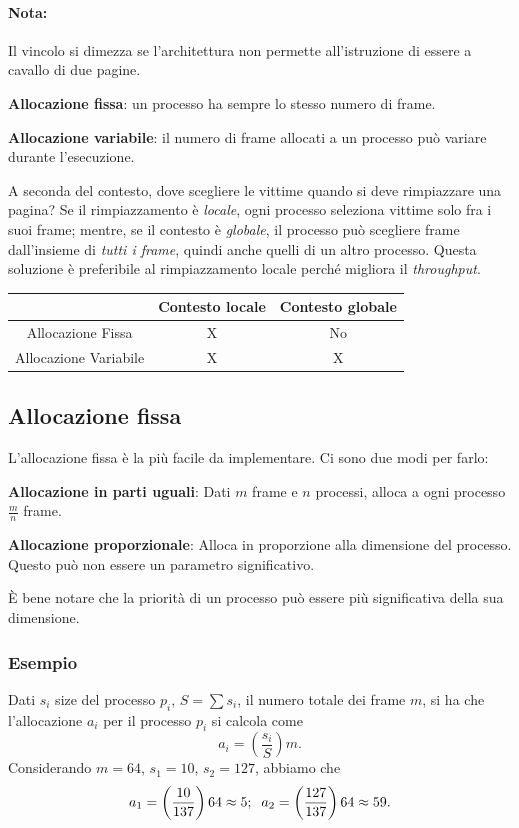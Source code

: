 \documentclass[a4paper,12pt, twoside]{report}
\newcommand{\defbox}[1]{\noindent\colorbox{shadecolor}
{\parbox{\dimexpr\textwidth-2\fboxsep\relax}{#1}}}
\begin{document}
\paragraph{Nota:} Il vincolo si dimezza se l'architettura non permette all'istruzione 
di essere a cavallo di due pagine. 

\defbox{\textbf{Allocazione fissa}: un processo ha sempre lo stesso numero di frame.}
\defbox{\textbf{Allocazione variabile}: il numero di frame allocati a un processo pu\`o variare durante l'esecuzione.}

A seconda del contesto, dove scegliere le vittime quando si deve rimpiazzare una pagina?
Se il rimpiazzamento \`e \emph{locale}, ogni processo seleziona vittime solo fra i suoi frame; mentre, se 
il contesto \`e \emph{globale}, il processo pu\`o scegliere frame dall'insieme di \emph{tutti i frame}, quindi 
anche quelli di un altro processo. Questa soluzione \`e preferibile al rimpiazzamento locale perch\'e migliora 
il \emph{throughput}.

\begin{center}
\begin{tabular}{| c || c | c |}
    \hline
    & Contesto  locale & Contesto  globale \\
    \hline 
    \hline 
    Allocazione  Fissa & X & No \\
    \hline
    Allocazione  Variabile & X & X \\
    \hline 
\end{tabular} 
\end{center}

\subsection{Allocazione fissa}
L'allocazione fissa \`e la pi\`u facile da implementare. Ci sono due modi per farlo:
\defbox{\textbf{Allocazione in parti uguali}: Dati $m$ frame e $n$ processi, alloca a ogni processo 
$\frac{m}{n}$ frame.}
\defbox{\textbf{Allocazione proporzionale}: Alloca in proporzione alla dimensione del processo. Questo pu\`o 
non essere un parametro significativo.}

\`E bene notare che la priorit\`a di un processo pu\`o essere pi\`u significativa della  sua dimensione.

\subsubsection{Esempio}
Dati $s_i$ size del processo $p_i$, $S = \sum s_i$, il numero totale dei frame $m$, si ha che l'allocazione $a_i$
per il processo $p_i$ si calcola come 
\[a_i  = \left( \frac{s_i}{S} \right) m.\]
Considerando $m = 64$, $s_1 = 10$, $s_2 = 127$, abbiamo che 
\[ a_1 = \left(\frac{10}{137} \right)64 \approx 5; \thickspace \thickspace a_2 = \left(\frac{127}{137}\right)64 \approx 59.\]
\end{document}
